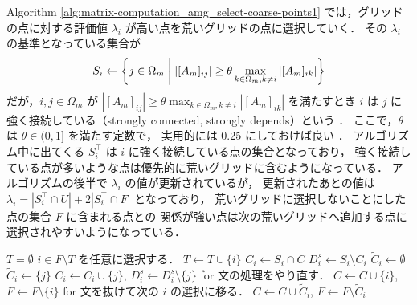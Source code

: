 Algorithm \ref{alg:matrix-computation_amg_select-coarse-points1}
では，グリッドの点に対する評価値 $\lambda_i$ が高い点を荒いグリッドの点に選択していく．
その $\lambda_i$ の基準となっている集合が
\begin{equation}
    S_i \gets \left\{j \in \Omega_m \relmiddle| %
    \left| [A_m]_{ij} \right| \ge \theta %
    \max_{k \in \Omega_m, k \neq i} \left| [A_m]_{ik} \right| \right\}
\end{equation}
だが，$i, j \in \Omega_m$ が
$\left| [A_m]_{ij} \right| \ge \theta %
    \max_{k \in \Omega_m, k \neq i} \left| [A_m]_{ik} \right|$
を満たすとき $i$ は $j$ に強く接続している（strongly connected, strongly depends）という
\cite{Ruge1987}．
ここで，$\theta$ は $\theta \in (0, 1]$ を満たす定数で，
実用的には 0.25 にしておけば良い
\cite{Ruge1987}．
アルゴリズム中に出てくる $S_i^\top$ は $i$ に強く接続している点の集合となっており，
強く接続している点が多いような点は優先的に荒いグリッドに含むようになっている．
アルゴリズムの後半で $\lambda_i$ の値が更新されているが，
更新されたあとの値は
$\lambda_i = \left|S_i^\top \cap U\right| + 2 \left|S_i^\top \cap F\right|$
となっており，
荒いグリッドに選択しないことにした点の集合 $F$ に含まれる点との
関係が強い点は次の荒いグリッドへ追加する点に選択されやすいようになっている．

\begin{algorithm}[tp]
    \caption{Algebraic Multigrid (AMG) 法における荒いグリッドの点の選択（ステップ 2）%
        （\cite{Ruge1987} をもとに一部変更）}
    \label{alg:matrix-computation_amg_select-coarse-points2}
    \begin{algorithmic}
        \State $T = \emptyset$
        \State $i \in F \setminus T$ を任意に選択する．
        \State $T \gets T \cup \{i\}$
        \State $C_i \gets S_i \cap C$
        \State $D_i^s \gets S_i \setminus C_i$
        \State $\tilde{C}_i \gets \emptyset$
        \State $\tilde{C}_i \gets \{j\}$
        \State $C_i \gets C_i \cup \{j\}$, $D_i^s \gets D_i^s \setminus \{j\}$
        \State for 文の処理をやり直す．
        \Else
        \State $C \gets C \cup \{i\}$, $F \gets F \setminus \{i\}$
        \State for 文を抜けて次の $i$ の選択に移る．
        \EndIf
        \EndIf
        \EndFor
        \State $C \gets C \cup \tilde{C}_i$, $F \gets F \setminus \tilde{C}_i$
        \EndWhile
        \EndProcedure
    \end{algorithmic}
\end{algorithm}

